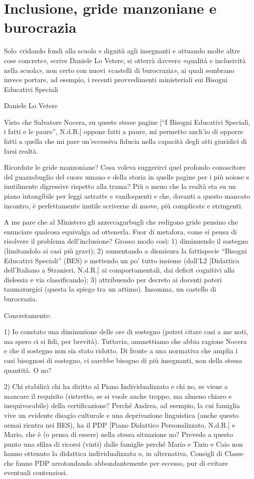 \chapter{Inclusione, gride manzoniane e burocrazia}
\label{cha:danilellovetere1}
\epigraph{Solo «ridando fondi alla scuola e dignità agli insegnanti e attuando molte altre cose concrete», scrive Daniele Lo Vetere, si otterrà davvero «qualità e inclusività nella scuola», non certo con nuovi «castelli di burocrazia», ai quali sembrano invece portare, ad esempio, i recenti provvedimenti ministeriali sui Bisogni Educativi Speciali}{Daniele Lo Vetere}

Visto che Salvatore Nocera, su queste stesse pagine [“I Bisogni Educativi Speciali, i fatti e le paure”, N.d.R.] oppone fatti a paure, mi permetto anch’io di opporre fatti a quella che mi pare un’eccessiva fiducia nella capacità degli atti giuridici di farsi realtà.

Ricordate le gride manzoniane? Cosa voleva suggerirci quel profondo conoscitore del guazzabuglio del cuore umano e della storia in quelle pagine per i più noiose e inutilmente digressive rispetto alla trama? Più o meno che la realtà sta su un piano intangibile per leggi astratte e vaniloquenti e che, davanti a questo mancato incontro, è perfettamente inutile scriverne di nuove, più complicate e stringenti.

A me pare che al Ministero gli azzeccagarbugli che redigono gride pensino che enunciare qualcosa equivalga ad ottenerla.
Fuor di metafora, come si pensa di risolvere il problema dell’inclusione? Grosso modo così: 1) diminuendo il sostegno (limitandolo ai casi più gravi); 2) aumentando a dismisura la fattispecie “Bisogni Educativi Speciali” (BES) e mettendo un po’ tutto insieme (dall’L2 [Didattica dell’Italiano a Stranieri, N.d.R.] ai comportamentali, dai deficit cognitivi alla dislessia e via classificando); 3) attribuendo per decreto ai docenti poteri taumaturgici (questa la spiego tra un attimo). Insomma, un castello di burocrazia.

Concretamente:

1) Io constato una diminuzione delle ore di sostegno (potrei citare casi a me noti, ma spero ci si fidi, per brevità). Tuttavia, ammettiamo che abbia ragione Nocera e che il sostegno non sia stato ridotto. Di fronte a una normativa che amplia i casi bisognosi di sostegno, ci sarebbe bisogno di più insegnanti, non della stessa quantità. O no?

2) Chi stabilirà chi ha diritto al Piano Individualizzato e chi no, se viene a mancare il requisito (ristretto, se si vuole anche troppo, ma almeno chiaro e inequivocabile) della certificazione? Perché Andrea, ad esempio, la cui famiglia vive un evidente disagio culturale e una deprivazione linguistica (anche questo ormai rientra nei BES), ha il PDP [Piano Didattico Personalizzato, N.d.R.] e Mario, che è (o pensa di essere) nella stessa situazione no? Prevedo a questo punto una sfilza di ricorsi (vinti) dalle famiglie perché Mario e Tizio e Caio non hanno ottenuto la didattica individualizzata o, in alternativa, Consigli di Classe che fanno PDP arrotondando abbondantemente per eccesso, pur di evitare eventuali contenziosi.

